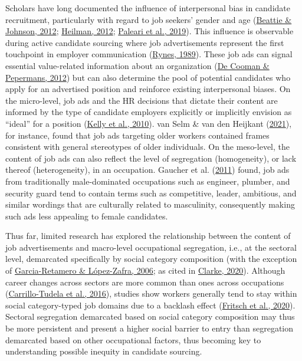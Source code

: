 \documentclass[
  12pt,
  letterpaper,
  DIV=11,
  numbers=noendperiod]{scrartcl}
\begin{document}
Scholars have long documented the influence of interpersonal bias in
candidate recruitment, particularly with regard to job seekers' gender
and age
(\protect\hyperlink{ref-beattie2012PossibleUnconsciousBias}{Beattie \&
Johnson, 2012};
\protect\hyperlink{ref-heilman2012GenderStereotypesWorkplace}{Heilman,
2012}; \protect\hyperlink{ref-paleari2019WhenPrejudiceYou}{Paleari et
al., 2019}). This influence is observable during active candidate
sourcing where job advertisements represent the first touchpoint in
employer communication (\protect\hyperlink{ref-RynesS.1989}{Rynes,
1989}). These job ads can signal essential value-related information
about an organization
(\protect\hyperlink{ref-decooman2012PortrayingFittingValues}{De Cooman
\& Pepermans, 2012}) but can also determine the pool of potential
candidates who apply for an advertised position and reinforce existing
interpersonal biases. On the micro-level, job ads and the HR decisions
that dictate their content are informed by the type of candidate
employers explicitly or implicitly envision as ``ideal'' for a position
(\protect\hyperlink{ref-kelly2010GenderedChallengeGendered}{Kelly et
al., 2010}). van Selm \& van den Heijkant
(\protect\hyperlink{ref-vanselm2021SearchOlderWorker}{2021}), for
instance, found that job ads targeting older workers contained frames
consistent with general stereotypes of older individuals. On the
meso-level, the content of job ads can also reflect the level of
segregation (homogeneity), or lack thereof (heterogeneity), in an
occupation. Gaucher et al.
(\protect\hyperlink{ref-gaucher2011EvidenceThatGendered}{2011}) found,
job ads from traditionally male-dominated occupations such as engineer,
plumber, and security guard tend to contain terms such as competitive,
leader, ambitious, and similar wordings that are culturally related to
masculinity, consequently making such ads less appealing to female
candidates.

Thus far, limited research has explored the relationship between the
content of job advertisements and macro-level occupational segregation,
i.e., at the sectoral level, demarcated specifically by social category
composition (with the exception of
\protect\hyperlink{ref-garcia-retamero2006PrejudiceWomenMalecongenial}{Garcia-Retamero
\& López-Zafra, 2006}; as cited in
\protect\hyperlink{ref-clarke2020GenderStereotypesGenderTyped}{Clarke,
2020}). Although career changes across sectors are more common than ones
across occupations
(\protect\hyperlink{ref-carrillo-tudela_extent_2016}{Carrillo-Tudela et
al., 2016}), studies show workers generally tend to stay within social
category-typed job domains due to a backlash effect
(\protect\hyperlink{ref-fritsch_horizontal_2020}{Fritsch et al., 2020}).
Sectoral segregation demarcated based on social category composition may
thus be more persistent and present a higher social barrier to entry
than segregation demarcated based on other occupational factors, thus
becoming key to understanding possible inequity in candidate sourcing.
\end{document}
